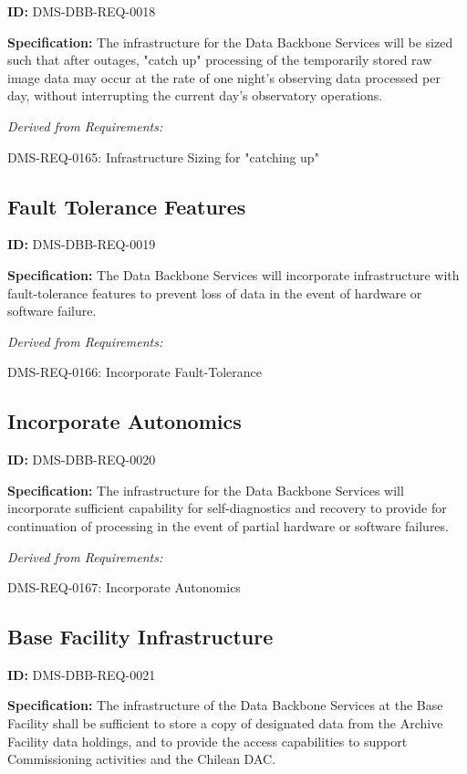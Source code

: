 \documentclass[SE,toc]{lsstdoc}
\begin{document}
\label{DMS-DBB-REQ-0018}
\textbf{ID:} DMS-DBB-REQ-0018

\textbf{Specification:}
The infrastructure for the Data Backbone Services will be sized such that after outages, "catch up" processing of the temporarily stored raw image data may occur at the rate of one night’s observing data processed per day, without interrupting the current day's observatory operations.

\emph{Derived from Requirements:}

DMS-REQ-0165:
Infrastructure Sizing for "catching up" \newline

\subsection{Fault Tolerance Features}

\label{DMS-DBB-REQ-0019}
\textbf{ID:} DMS-DBB-REQ-0019

\textbf{Specification:}
The Data Backbone Services will incorporate infrastructure with fault-tolerance features to prevent loss of data in the event of hardware or software failure.

\emph{Derived from Requirements:}

DMS-REQ-0166:
Incorporate Fault-Tolerance \newline

\subsection{Incorporate Autonomics}

\label{DMS-DBB-REQ-0020}
\textbf{ID:} DMS-DBB-REQ-0020

\textbf{Specification:}
The infrastructure for the Data Backbone Services will incorporate sufficient capability for self-diagnostics and recovery to provide for continuation of processing in the event of partial hardware or software failures.

\emph{Derived from Requirements:}

DMS-REQ-0167:
Incorporate Autonomics \newline

\subsection{Base Facility Infrastructure}

\label{DMS-DBB-REQ-0021}
\textbf{ID:} DMS-DBB-REQ-0021

\textbf{Specification:}
The infrastructure of the Data Backbone Services at the Base Facility shall be sufficient to store a copy of designated data from the Archive Facility data holdings, and to provide the access capabilities to support Commissioning activities and the Chilean DAC.
\end{document}
